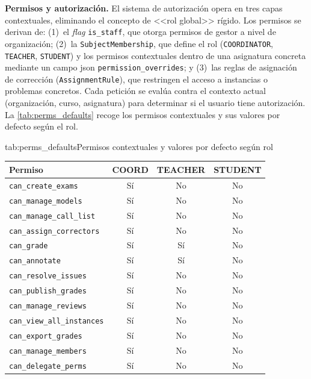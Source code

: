 
\item \textbf{Permisos y autorización.} \label{rf:perms}
El sistema de autorización opera en tres capas contextuales, eliminando el concepto de
<<rol global>> rígido. Los permisos se derivan de: (1)~el \textit{flag}
\texttt{is\_staff}, que otorga permisos de gestor a nivel de organización;
(2)~la \texttt{SubjectMembership}, que define el rol (\texttt{COORDINATOR},
\texttt{TEACHER}, \texttt{STUDENT}) y los permisos contextuales dentro de una asignatura
concreta mediante un campo \acs{json} \texttt{permission\_overrides}; y (3)~las reglas de
asignación de corrección (\texttt{AssignmentRule}), que restringen el acceso a instancias
o problemas concretos. Cada petición se evalúa contra el contexto actual (organización,
curso, asignatura) para determinar si el usuario tiene autorización. La
\cref{tab:perms_defaults} recoge los permisos contextuales y sus valores por defecto según
el rol.

\begin{table}{tab:perms_defaults}{Permisos contextuales y valores por defecto según rol}
    \begin{tabular}{lccc}
        \hline
        \textbf{Permiso} & \textbf{COORD} & \textbf{TEACHER} & \textbf{STUDENT} \\
        \hline
        \texttt{can\_create\_exams}       & Sí & No & No \\
        \texttt{can\_manage\_models}      & Sí & No & No \\
        \texttt{can\_manage\_call\_list}  & Sí & No & No \\
        \texttt{can\_assign\_correctors}  & Sí & No & No \\
        \texttt{can\_grade}               & Sí & Sí & No \\
        \texttt{can\_annotate}            & Sí & Sí & No \\
        \texttt{can\_resolve\_issues}     & Sí & No & No \\
        \texttt{can\_publish\_grades}     & Sí & No & No \\
        \texttt{can\_manage\_reviews}     & Sí & No & No \\
        \texttt{can\_view\_all\_instances} & Sí & No & No \\
        \texttt{can\_export\_grades}      & Sí & No & No \\
        \texttt{can\_manage\_members}     & Sí & No & No \\
        \texttt{can\_delegate\_perms}     & Sí & No & No \\
        \hline
    \end{tabular}
\end{table}

